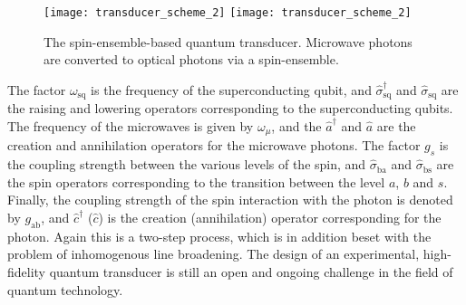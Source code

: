 \begin{figure}[!htbp]
\pubmode
\texttt{[image: transducer\_scheme\_2]}
\else
\texttt{[image: transducer\_scheme\_2]}
\fi
\captionspacefig \caption{The spin-ensemble-based quantum transducer. Microwave photons are converted to optical photons via a spin-ensemble.}\label{fig:spin_ens_transducer}
\end{figure}

The factor $\omega_\mathrm{sq}$ is the frequency of the superconducting qubit, and $\hat\sigma_\mathrm{sq}^{\dag}$ and $\hat\sigma_\mathrm{sq}$ are the raising and lowering operators corresponding to the superconducting qubits. The frequency of the microwaves is given by $\omega_{\mu}$, and the $\hat{a}^{\dag}$ and $\hat{a}$ are the creation and annihilation operators for the microwave photons. The factor $g_{s}$ is the coupling strength between the various levels of the spin, and $\hat\sigma_\mathrm{ba}$ and $\hat\sigma_\mathrm{bs}$ are the spin operators corresponding to the transition between the level $a$, $b$ and $s$. Finally, the coupling strength of the spin interaction with the photon is denoted by $g_\mathrm{ab}$, and $\hat{c}^{\dag}$ ($\hat{c}$) is the creation (annihilation) operator corresponding for the photon. Again this is a two-step process, which is in addition beset with the problem of inhomogenous line broadening. The design of an experimental, high-fidelity quantum transducer is still an open and ongoing challenge in the field of quantum technology.